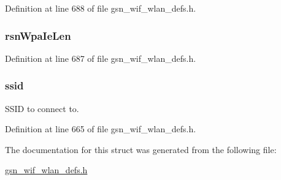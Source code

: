 Definition at line 688 of file gsn\_\-wif\_\-wlan\_\-defs.h.

\hypertarget{a00374_a56182cfaceef2b0b98b4597289a33965}{
\subsubsection[{rsnWpaIeLen}]{ {\bf rsnWpaIeLen}}}
\label{a00374_a56182cfaceef2b0b98b4597289a33965}


Definition at line 687 of file gsn\_\-wif\_\-wlan\_\-defs.h.

\hypertarget{a00374_a9bcb2e5a0dbdd5461faec24950cf7459}{
\subsubsection[{ssid}]{ {\bf ssid}}}
\label{a00374_a9bcb2e5a0dbdd5461faec24950cf7459}
SSID to connect to. 

Definition at line 665 of file gsn\_\-wif\_\-wlan\_\-defs.h.



The documentation for this struct was generated from the following file:\begin{DoxyCompactItemize}
\item 
\hyperlink{a00613}{gsn\_\-wif\_\-wlan\_\-defs.h}\end{DoxyCompactItemize}
